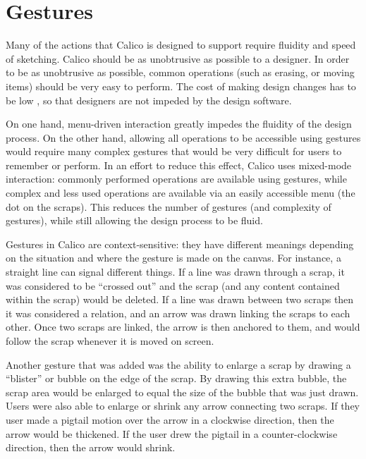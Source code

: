 \section{Gestures}
Many of the actions that Calico is designed to support require fluidity and speed of sketching. Calico should be as unobtrusive as possible to a designer. In order to be as unobtrusive as possible, common operations (such as erasing, or moving items) should be very easy to perform. The cost of making design changes has to be low \cite{petre}, so that designers are not impeded by the design software.

On one hand, menu-driven interaction greatly impedes the fluidity of the design process. On the other hand, allowing all operations to be accessible using gestures would require many complex gestures that would be very difficult for users to remember or perform. In an effort to reduce this effect, Calico uses mixed-mode interaction: commonly performed operations are available using gestures, while complex and less used operations are available via an easily accessible menu (the dot on the scraps). This reduces the number of gestures (and complexity of gestures), while still allowing the design process to be fluid.

Gestures in Calico are context-sensitive: they have different meanings depending on the situation and where the gesture is made on the canvas. 
For instance, a straight line can signal different things. 
If a line was drawn through a scrap, it was considered to be ``crossed out'' and the scrap (and any content contained within the scrap) would be deleted. 
If a line was drawn between two scraps then it was considered a relation, and an arrow was drawn linking the scraps to each other.
Once two scraps are linked, the arrow is then anchored to them, and would follow the scrap whenever it is moved on screen.

Another gesture that was added was the ability to enlarge a scrap by drawing a ``blister'' or bubble on the edge of the scrap.
By drawing this extra bubble, the scrap area would be enlarged to equal the size of the bubble that was just drawn. 
Users were also able to enlarge or shrink any arrow connecting two scraps. If they user made a pigtail motion over the arrow in a clockwise direction, then the arrow would be thickened. If the user drew the pigtail in a counter-clockwise direction, then the arrow would shrink.


